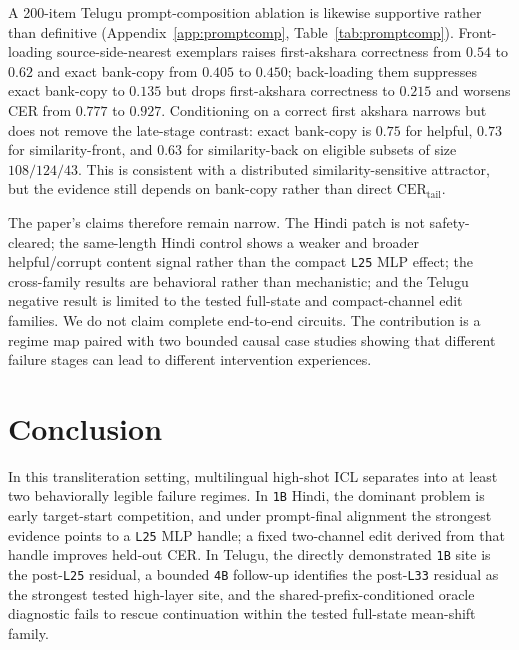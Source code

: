 \documentclass{article}
\begin{document}
A 200-item Telugu prompt-composition ablation is likewise supportive rather than definitive (Appendix~\ref{app:promptcomp}, Table~\ref{tab:promptcomp}). Front-loading source-side-nearest exemplars raises first-akshara correctness from $0.54$ to $0.62$ and exact bank-copy from $0.405$ to $0.450$; back-loading them suppresses exact bank-copy to $0.135$ but drops first-akshara correctness to $0.215$ and worsens CER from $0.777$ to $0.927$. Conditioning on a correct first akshara narrows but does not remove the late-stage contrast: exact bank-copy is $0.75$ for helpful, $0.73$ for similarity-front, and $0.63$ for similarity-back on eligible subsets of size $108/124/43$. This is consistent with a distributed similarity-sensitive attractor, but the evidence still depends on bank-copy rather than direct $\mathrm{CER}_{\mathrm{tail}}$.

The paper's claims therefore remain narrow. The Hindi patch is not safety-cleared; the same-length Hindi control shows a weaker and broader helpful/corrupt content signal rather than the compact \texttt{L25} MLP effect; the cross-family results are behavioral rather than mechanistic; and the Telugu negative result is limited to the tested full-state and compact-channel edit families. We do not claim complete end-to-end circuits. The contribution is a regime map paired with two bounded causal case studies showing that different failure stages can lead to different intervention experiences.

\section{Conclusion}

In this transliteration setting, multilingual high-shot ICL separates into at least two behaviorally legible failure regimes. In \texttt{1B} Hindi, the dominant problem is early target-start competition, and under prompt-final alignment the strongest evidence points to a \texttt{L25} MLP handle; a fixed two-channel edit derived from that handle improves held-out CER. In Telugu, the directly demonstrated \texttt{1B} site is the post-\texttt{L25} residual, a bounded \texttt{4B} follow-up identifies the post-\texttt{L33} residual as the strongest tested high-layer site, and the shared-prefix-conditioned oracle diagnostic fails to rescue continuation within the tested full-state mean-shift family.
\end{document}
